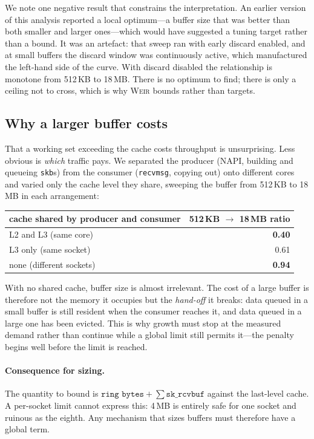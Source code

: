 \documentclass[letterpaper,twocolumn,10pt]{article}
\newcommand{\sys}{\textsc{Weir}\xspace}
\begin{document}
We note one negative result that constrains the interpretation. An earlier
version of this analysis reported a local optimum---a buffer size that was
better than both smaller and larger ones---which would have suggested a tuning
target rather than a bound. It was an artefact: that sweep ran with early
discard enabled, and at small buffers the discard window was continuously
active, which manufactured the left-hand side of the curve. With discard
disabled the relationship is monotone from 512\,KB to 18\,MB. There is no
optimum to find; there is only a ceiling not to cross, which is why \sys bounds
rather than targets.

\subsection{Why a larger buffer costs}

That a working set exceeding the cache costs throughput is unsurprising. Less
obvious is \emph{which} traffic pays. We separated the producer (NAPI, building
and queueing \texttt{skb}s) from the consumer (\texttt{recvmsg}, copying out)
onto different cores and varied only the cache level they share, sweeping the
buffer from 512\,KB to 18\,MB in each arrangement:

\begin{center}
\small
\begin{tabular}{@{}lr@{}}
\toprule
cache shared by producer and consumer & 512\,KB $\to$ 18\,MB ratio \\
\midrule
L2 and L3 (same core) & \textbf{0.40} \\
L3 only (same socket) & 0.61 \\
none (different sockets) & \textbf{0.94} \\
\bottomrule
\end{tabular}
\end{center}

With no shared cache, buffer size is almost irrelevant. The cost of a large
buffer is therefore not the memory it occupies but the \emph{hand-off} it
breaks: data queued in a small buffer is still resident when the consumer
reaches it, and data queued in a large one has been evicted. This is why
growth must stop at the measured demand rather than continue while a global
limit still permits it---the penalty begins well before the limit is reached.

\paragraph{Consequence for sizing.} The quantity to bound is
$\texttt{ring bytes} + \sum \texttt{sk\_rcvbuf}$ against the last-level cache.
A per-socket limit cannot express this: 4\,MB is entirely safe for one socket
and ruinous as the eighth. Any mechanism that sizes buffers must therefore have
a global term.
\end{document}
